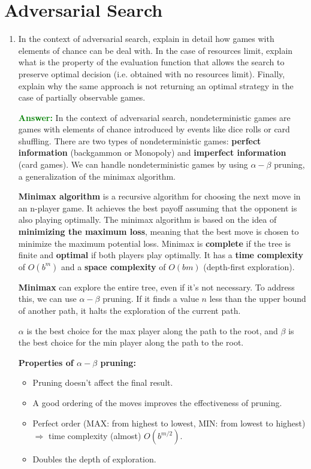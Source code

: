 \documentclass[12pt]{article}
\begin{document}
\section{Adversarial Search}
\begin{enumerate}[label=\textbf{AS.\arabic*}]
    \item In the context of adversarial search, explain in detail how games with elements of chance can be deal with.
          In the case of resources limit, explain what is the property of the evaluation function that allows the search to
          preserve optimal decision (i.e. obtained with no resources limit).
          Finally, explain why the same approach is not returning an optimal strategy in the case of partially observable games.

          \textcolor{green}{\textbf{Answer:}}
          In the context of adversarial search, nondeterministic games are games with elements of chance introduced by events like dice rolls or card shuffling. There are two types of nondeterministic games: \textbf{perfect information} (backgammon or Monopoly) and \textbf{imperfect information} (card games). We can handle nondeterministic games by using $\alpha - \beta$ pruning, a generalization of the minimax algorithm.

          \textbf{Minimax algorithm} is a recursive algorithm for choosing the next move in an n-player game. It achieves the best payoff assuming that the opponent is also playing optimally. The minimax algorithm is based on the idea of \textbf{minimizing the maximum loss}, meaning that the best move is chosen to minimize the maximum potential loss. Minimax is \textbf{complete} if the tree is finite and \textbf{optimal} if both players play optimally. It has a \textbf{time complexity} of $O(b^m)$ and a \textbf{space complexity} of $O(bm)$ (depth-first exploration).

          \textbf{Minimax} can explore the entire tree, even if it's not necessary. To address this, we can use $\alpha - \beta$ pruning. If it finds a value $n$ less than the upper bound of another path, it halts the exploration of the current path.

          $\alpha$ is the best choice for the max player along the path to the root, and $\beta$ is the best choice for the min player along the path to the root.

          \textbf{Properties of $\alpha - \beta$ pruning:}
          \begin{itemize}
              \item Pruning doesn't affect the final result.
              \item A good ordering of the moves improves the effectiveness of pruning.
              \item Perfect order (MAX: from highest to lowest, MIN: from lowest to highest) $\Rightarrow$ time complexity (almost) $O(b^{m/2})$.
              \item Doubles the depth of exploration.
          \end{itemize}


\end{enumerate}
\end{document}
